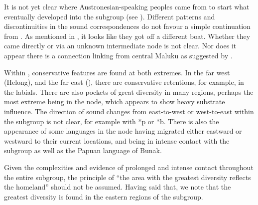 It is not yet clear where Austronesian-speaking peoples came
from to start what eventually developed into the  subgroup (see ).
Different patterns and discontinuities in the sound correspondences
do not favour a simple continuation from .
As mentioned in ,
it looks like they got off a different boat.
Whether they came directly or via an unknown intermediate node is not clear.
Nor does it appear there is a connection linking from central
Maluku as suggested by \citet{Blust1993,Blust2008}.

Within , conservative features are found at both extremes.
In the far west (Helong),
and the far east (),
there are conservative retentions,
for example, in the labials.
There are also pockets of great diversity in many regions,
perhaps the most extreme being in the 
node, which appears to show heavy substrate influence.
The direction of sound changes from east-to-west or west-to-east
within the subgroup is not clear,
for example with *p or *b.
There is also the appearance of some languages in the  node having migrated either eastward or westward to their
current locations, and being in intense contact with the  subgroup
as well as the Papuan language of Bunak.

Given the complexities and evidence of prolonged
and intense contact throughout the entire subgroup,
the principle of “the area with the greatest diversity reflects
the homeland” should not be assumed.
Having said that, we note that the greatest diversity is found
in the eastern regions of the subgroup.
